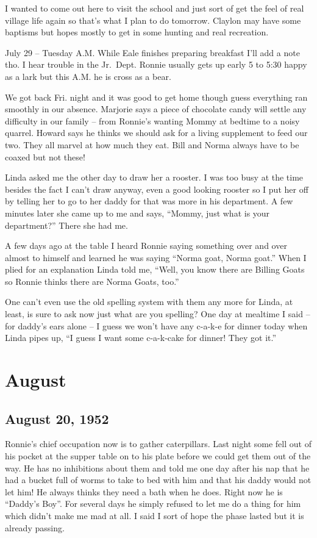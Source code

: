 \documentclass[
]{book}
\begin{document}
I wanted to come out here to visit the school and just sort of get the feel of real village life again so that's what I plan to do tomorrow. Claylon may have some baptisms but hopes mostly to get in some hunting and real recreation.

July 29 -- Tuesday A.M. While Eale finishes preparing breakfast I'll add a note tho. I hear trouble in the Jr.~Dept. Ronnie usually gets up early 5 to 5:30 happy as a lark but this A.M. he is cross as a bear.

We got back Fri. night and it was good to get home though guess everything ran smoothly in our absence. Marjorie says a piece of chocolate candy will settle any difficulty in our family -- from Ronnie's wanting Mommy at bedtime to a noisy quarrel. Howard says he thinks we should ask for a living supplement to feed our two. They all marvel at how much they eat. Bill and Norma always have to be coaxed but not these!

Linda asked me the other day to draw her a rooster. I was too busy at the time besides the fact I can't draw anyway, even a good looking rooster so I put her off by telling her to go to her daddy for that was more in his department. A few minutes later she came up to me and says, ``Mommy, just what is your department?'' There she had me.

A few days ago at the table I heard Ronnie saying something over and over almost to himself and learned he was saying ``Norma goat, Norma goat.'' When I plied for an explanation Linda told me, ``Well, you know there are Billing Goats so Ronnie thinks there are Norma Goats, too.''

One can't even use the old spelling system with them any more for Linda, at least, is sure to ask now just what are you spelling? One day at mealtime I said -- for daddy's ears alone -- I guess we won't have any c-a-k-e for dinner today when Linda pipes up, ``I guess I want some c-a-k-cake for dinner! They got it.''

\hypertarget{august-2}{%
\section{August}\label{august-2}}

\hypertarget{august-20-1952}{%
\subsection{August 20, 1952}\label{august-20-1952}}

Ronnie's chief occupation now is to gather caterpillars. Last night some fell out of his pocket at the supper table on to his plate before we could get them out of the way. He has no inhibitions about them and told me one day after his nap that he had a bucket full of worms to take to bed with him and that his daddy would not let him! He always thinks they need a bath when he does. Right now he is ``Daddy's Boy''. For several days he simply refused to let me do a thing for him which didn't make me mad at all. I said I sort of hope the phase lasted but it is already passing.
\end{document}
